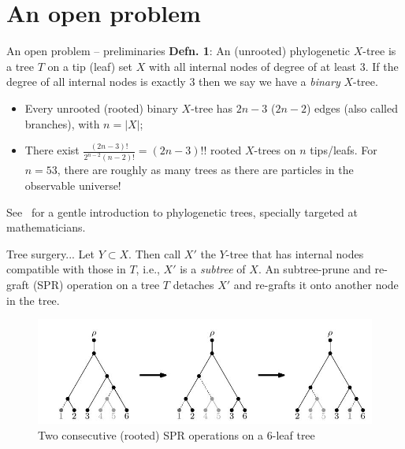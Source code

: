 \section*{An open problem}
\begin{frame}{An open problem -- preliminaries}
\textbf{Defn. 1}: An (unrooted) phylogenetic $X$-tree is a tree $T$ on a tip (leaf) set $X$ with all internal nodes of degree of at least $3$.
If the degree of all internal nodes is exactly $3$ then we say we have a \textit{binary} $X$-tree. 
\begin{itemize}
 \item Every unrooted (rooted) binary $X$-tree has $2n - 3$ ($2n - 2$) edges (also called branches), with $n = |X|$;
 \item There exist $\frac{(2n-3)!}{2^{n-2}(n-2)!} = (2n-3)!!$ rooted $X$-trees on $n$ tips/leafs.
For $n = 53$, there are roughly as many trees as there are particles in the observable universe!
\end{itemize}
See~\cite{steel2014} for a gentle introduction to phylogenetic trees, specially targeted at mathematicians.
\end{frame}
\begin{frame}{Tree surgery...}
Let $Y \subset X$. Then call $X'$ the $Y$-tree that has internal nodes compatible with those in $T$, i.e., $X'$ is a \textit{subtree} of $X$.
An subtree-prune and re-graft (SPR) operation on a tree $T$ detaches $X'$ and re-grafts it onto another node in the tree.
\begin{center}
 \begin{figure}
  \includegraphics[scale=0.5]{FIGURES/two_sprs.jpg}
  \caption{Two consecutive (rooted) SPR operations on a 6-leaf tree~\citep{whidden2015}}
 \end{figure}
\end{center}
\end{frame}
